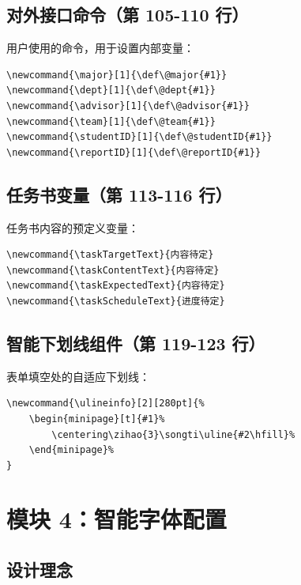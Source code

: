 \documentclass[linux]{hustreport}
\begin{document}
\subsection{对外接口命令（第 105-110 行）}

用户使用的命令，用于设置内部变量：

\begin{verbatim}
\newcommand{\major}[1]{\def\@major{#1}}
\newcommand{\dept}[1]{\def\@dept{#1}}
\newcommand{\advisor}[1]{\def\@advisor{#1}}
\newcommand{\team}[1]{\def\@team{#1}}
\newcommand{\studentID}[1]{\def\@studentID{#1}}
\newcommand{\reportID}[1]{\def\@reportID{#1}}
\end{verbatim}

\subsection{任务书变量（第 113-116 行）}

任务书内容的预定义变量：

\begin{verbatim}
\newcommand{\taskTargetText}{内容待定}
\newcommand{\taskContentText}{内容待定}
\newcommand{\taskExpectedText}{内容待定}
\newcommand{\taskScheduleText}{进度待定}
\end{verbatim}

\subsection{智能下划线组件（第 119-123 行）}

表单填空处的自适应下划线：

\begin{verbatim}
\newcommand{\ulineinfo}[2][280pt]{%
    \begin{minipage}[t]{#1}%
        \centering\zihao{3}\songti\uline{#2\hfill}%
    \end{minipage}%
}
\end{verbatim}

\newpage
\section{模块 4：智能字体配置}

\subsection{设计理念}
\end{document}
